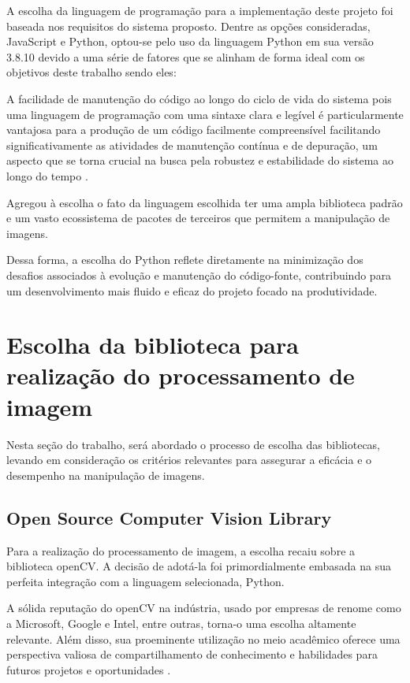 A escolha da linguagem de programação para a implementação deste projeto foi baseada nos requisitos do sistema proposto. Dentre as opções consideradas, JavaScript e Python, optou-se pelo uso da linguagem Python em sua versão 3.8.10 devido a uma série de fatores que se alinham de forma ideal com os objetivos deste trabalho sendo eles:

A facilidade de manutenção do código ao longo do ciclo de vida do sistema pois uma linguagem de programação com uma sintaxe clara e legível é particularmente vantajosa para a produção de um código facilmente compreensível facilitando significativamente as atividades de manutenção contínua e de depuração, um aspecto que se torna crucial na busca pela robustez e estabilidade do sistema ao longo do tempo \cite{clean_code}.

Agregou à escolha o fato da linguagem escolhida ter uma ampla biblioteca padrão e um vasto ecossistema de pacotes de terceiros que permitem a manipulação de imagens.

Dessa forma, a escolha do Python reflete diretamente na minimização dos desafios associados à evolução e manutenção do código-fonte, contribuindo para um desenvolvimento mais fluido e eficaz do projeto focado na produtividade.




\section[Escolha da biblioteca para realização do processamento de imagem]{Escolha da biblioteca para realização do processamento de imagem}\label{sec:Escolha da biblioteca para realizacao do processamento de imagem}

Nesta seção do trabalho, será abordado o processo de escolha das bibliotecas, levando em consideração os critérios relevantes para assegurar a eficácia e o desempenho na manipulação de imagens.


\subsection{Open Source Computer Vision Library}
Para a realização do processamento de imagem, a escolha recaiu sobre a biblioteca \ac{openCV}. A decisão de adotá-la foi primordialmente embasada na sua perfeita integração com a linguagem selecionada, Python.

A  sólida reputação do \ac{openCV} na indústria, usado por empresas de renome como a Microsoft, Google e Intel, entre outras,  torna-o uma escolha altamente relevante. Além disso, sua proeminente utilização no meio acadêmico oferece uma perspectiva valiosa de compartilhamento de conhecimento e habilidades para futuros projetos e oportunidades \cite{opencv_docs}.
 

